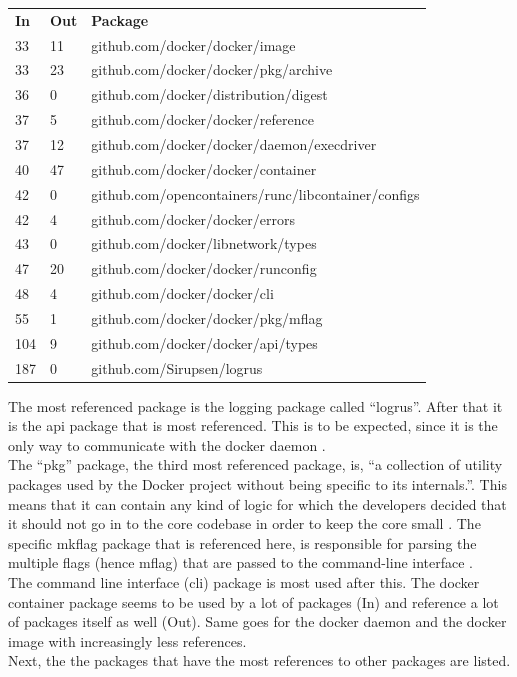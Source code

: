 \begin{tabular}{l l l}
\textbf{In} & \textbf{Out} & \textbf{Package} \\
33 & 11 & github.com/docker/docker/image \\
33 & 23 & github.com/docker/docker/pkg/archive \\
36 & 0 & github.com/docker/distribution/digest \\
37 & 5 & github.com/docker/docker/reference \\
37 & 12 & github.com/docker/docker/daemon/execdriver \\
40 & 47 & github.com/docker/docker/container \\
42 & 0 & github.com/opencontainers/runc/libcontainer/configs \\
42 & 4 & github.com/docker/docker/errors \\
43 & 0 & github.com/docker/libnetwork/types \\
47 & 20 & github.com/docker/docker/runconfig \\
48 & 4 & github.com/docker/docker/cli \\
55 & 1 & github.com/docker/docker/pkg/mflag \\
104 & 9 & github.com/docker/docker/api/types \\
187 & 0 & github.com/Sirupsen/logrus \\
\end{tabular} 

The most referenced package is the logging package called ``logrus''. After that it is the api package that is most referenced. This is to be expected, since it is the only way to communicate with the docker daemon \cite{dockerapi}. \\
The ``pkg'' package, the third most referenced package, is, ``a collection of utility packages used by the Docker project without being specific to its internals.''. This means that it can contain any kind of logic for which the developers decided that it should not go in to the core codebase in order to keep the core small \cite{dockerpkg}. The specific mkflag package that is referenced here, is responsible for parsing the multiple flags (hence mflag) that are passed to the command-line interface \cite{dockermflag}. \\
The command line interface (cli) package is most used after this. The docker container package seems to be used by a lot of packages (In) and reference a lot of packages itself as well (Out). Same goes for the docker daemon and the docker image with increasingly less references. \\
Next, the the packages that have the most references to other packages are listed.

